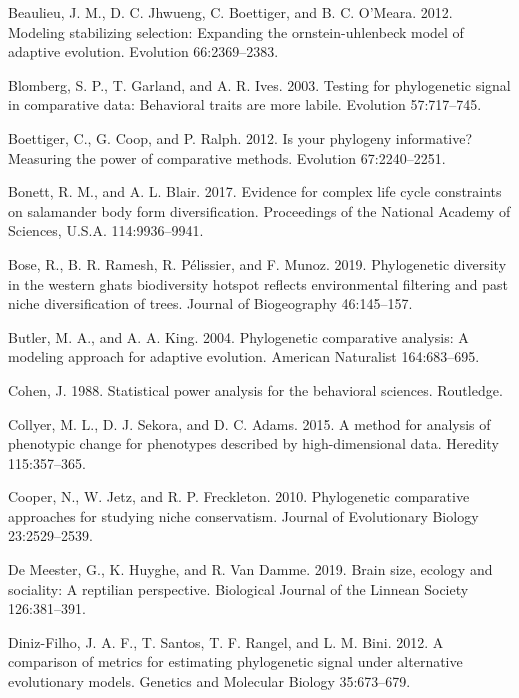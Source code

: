 \documentclass[
]{article}
\begin{document}
\leavevmode\hypertarget{ref-Beaulieu_et_al2012}{}%
Beaulieu, J. M., D. C. Jhwueng, C. Boettiger, and B. C. O'Meara. 2012.
Modeling stabilizing selection: Expanding the ornstein-uhlenbeck model
of adaptive evolution. Evolution 66:2369--2383.

\leavevmode\hypertarget{ref-Blomberg_et_al2003}{}%
Blomberg, S. P., T. Garland, and A. R. Ives. 2003. Testing for
phylogenetic signal in comparative data: Behavioral traits are more
labile. Evolution 57:717--745.

\leavevmode\hypertarget{ref-Boettiger_et_al2012}{}%
Boettiger, C., G. Coop, and P. Ralph. 2012. Is your phylogeny
informative? Measuring the power of comparative methods. Evolution
67:2240--2251.

\leavevmode\hypertarget{ref-Bonett2017}{}%
Bonett, R. M., and A. L. Blair. 2017. Evidence for complex life cycle
constraints on salamander body form diversification. Proceedings of the
National Academy of Sciences, U.S.A. 114:9936--9941.

\leavevmode\hypertarget{ref-Bose2019}{}%
Bose, R., B. R. Ramesh, R. Pélissier, and F. Munoz. 2019. Phylogenetic
diversity in the western ghats biodiversity hotspot reflects
environmental filtering and past niche diversification of trees. Journal
of Biogeography 46:145--157.

\leavevmode\hypertarget{ref-ButlerKing2004}{}%
Butler, M. A., and A. A. King. 2004. Phylogenetic comparative analysis:
A modeling approach for adaptive evolution. American Naturalist
164:683--695.

\leavevmode\hypertarget{ref-Cohen1988}{}%
Cohen, J. 1988. Statistical power analysis for the behavioral sciences.
Routledge.

\leavevmode\hypertarget{ref-Collyer_et_al2015a}{}%
Collyer, M. L., D. J. Sekora, and D. C. Adams. 2015. A method for
analysis of phenotypic change for phenotypes described by
high-dimensional data. Heredity 115:357--365.

\leavevmode\hypertarget{ref-Cooper2010}{}%
Cooper, N., W. Jetz, and R. P. Freckleton. 2010. Phylogenetic
comparative approaches for studying niche conservatism. Journal of
Evolutionary Biology 23:2529--2539.

\leavevmode\hypertarget{ref-DeMeester2019}{}%
De Meester, G., K. Huyghe, and R. Van Damme. 2019. Brain size, ecology
and sociality: A reptilian perspective. Biological Journal of the
Linnean Society 126:381--391.

\leavevmode\hypertarget{ref-DinizFilho2012}{}%
Diniz-Filho, J. A. F., T. Santos, T. F. Rangel, and L. M. Bini. 2012. A
comparison of metrics for estimating phylogenetic signal under
alternative evolutionary models. Genetics and Molecular Biology
35:673--679.
\end{document}
